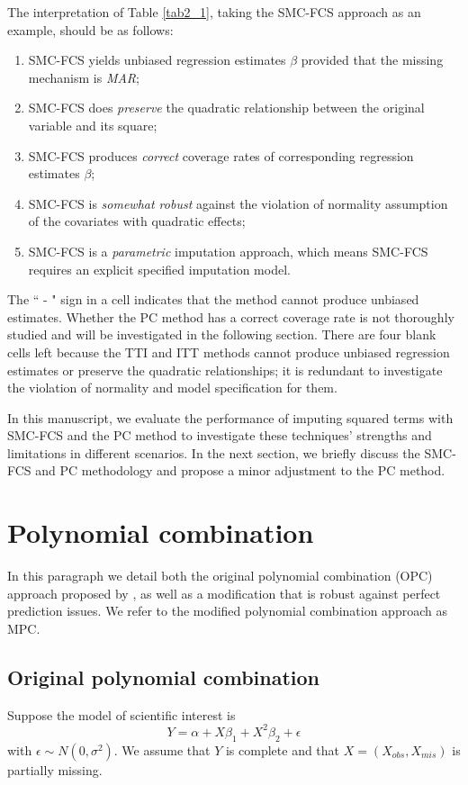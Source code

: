 	The interpretation of Table \ref{tab2_1}, taking the SMC-FCS approach as an example, should be as follows:
	\begin{enumerate}
		\item SMC-FCS yields unbiased regression estimates $\beta$ provided that the missing mechanism is \emph{MAR};
		\item SMC-FCS does \emph{preserve} the quadratic relationship between the original variable and its square;
		\item SMC-FCS produces \emph{correct} coverage rates of corresponding regression estimates $\beta$; 
		\item SMC-FCS is \emph{somewhat robust} against the violation of normality assumption of the covariates with quadratic effects;
		\item SMC-FCS is a \emph{parametric} imputation approach, which means SMC-FCS requires an explicit specified imputation model. 
	\end{enumerate}
	The `` - " sign in a cell indicates that the method cannot produce unbiased estimates. Whether the PC method has a correct coverage rate is not thoroughly studied and will be investigated in the following section. There are four blank cells left because the TTI and ITT methods cannot produce unbiased regression estimates or preserve the quadratic relationships; it is redundant to investigate the violation of normality and model specification for them.    
	
	In this manuscript, we evaluate the performance of imputing squared terms with SMC-FCS and the PC method to investigate these techniques' strengths and limitations in different scenarios. In the next section, we briefly discuss the SMC-FCS and PC methodology and propose a minor adjustment to the PC method.
	
	\section{Polynomial combination}
	In this paragraph we detail both the original polynomial combination (OPC) approach proposed by \citet{Vink2013}, as well as a modification that is robust against perfect prediction issues. We refer to the modified polynomial combination approach as MPC. 
	\subsection{Original polynomial combination}
	Suppose the model of scientific interest is 
	\begin{equation}
		Y = \alpha + X\beta_{1} + X^2\beta_{2} +\epsilon
		\label{eqn2_1}
	\end{equation}
	with $\epsilon \sim N(0, \sigma^2)$. We assume that $Y$ is complete and that $X = (X_{obs}, X_{mis})$ is partially missing. 
	
